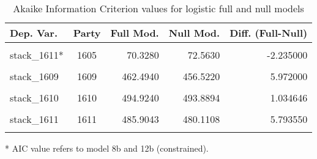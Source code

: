 \documentclass[
]{article}
\begin{document}
\begin{table}[!h]

\caption{\label{tab:unnamed-chunk-104}Akaike Information Criterion values for logistic full and null models 
        \label{table:logit_aic_lv}}
\centering
\begin{threeparttable}
\begin{tabular}[t]{lcrrr}
\toprule
Dep. Var. & Party & Full Mod. & Null Mod. & Diff. (Full-Null)\\
\midrule
\cellcolor{gray!6}{stack\_1604} & \cellcolor{gray!6}{1604} & \cellcolor{gray!6}{276.4690} & \cellcolor{gray!6}{270.1370} & \cellcolor{gray!6}{6.332000}\\
stack\_1611* & 1605 & 70.3280 & 72.5630 & -2.235000\\
\cellcolor{gray!6}{stack\_1608} & \cellcolor{gray!6}{1608} & \cellcolor{gray!6}{296.2430} & \cellcolor{gray!6}{282.6840} & \cellcolor{gray!6}{13.559000}\\
stack\_1609 & 1609 & 462.4940 & 456.5220 & 5.972000\\
\cellcolor{gray!6}{stack\_1610} & \cellcolor{gray!6}{1610} & \cellcolor{gray!6}{493.9400} & \cellcolor{gray!6}{493.8890} & \cellcolor{gray!6}{0.051000}\\
\addlinespace
stack\_1610 & 1610 & 494.9240 & 493.8894 & 1.034646\\
\cellcolor{gray!6}{stack\_1611} & \cellcolor{gray!6}{1611} & \cellcolor{gray!6}{486.0990} & \cellcolor{gray!6}{480.1110} & \cellcolor{gray!6}{5.988000}\\
stack\_1611 & 1611 & 485.9043 & 480.1108 & 5.793550\\
\cellcolor{gray!6}{stack\_1610*} & \cellcolor{gray!6}{1616} & \cellcolor{gray!6}{597.1950} & \cellcolor{gray!6}{625.7790} & \cellcolor{gray!6}{-28.584000}\\
\bottomrule
\end{tabular}
\begin{tablenotes}[para]
\item[*] AIC value refers to model 8b and 12b (constrained).
\end{tablenotes}
\end{threeparttable}
\end{table}
\end{document}
